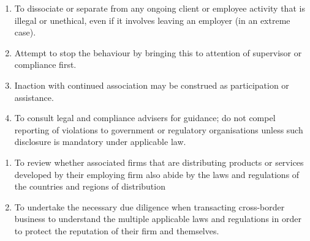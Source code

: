 \begin{remark} 
\begin{enumerate}[label=\roman*.]
\setlength{\itemsep}{0pt}
\item To dissociate or separate from any ongoing client or employee activity that is illegal or unethical, even if it involves leaving an employer (in an extreme case).
\item Attempt to stop the behaviour by bringing this to attention of supervisor or compliance first.
\item Inaction with continued association may be construed as participation or assistance.
\item To consult legal and compliance advisers for guidance; do not compel reporting of violations to government or regulatory organisations unless such disclosure is mandatory under applicable law.
\end{enumerate}
\end{remark}

\begin{remark} 
\begin{enumerate}[label=\roman*.]
\setlength{\itemsep}{0pt}
\item To review whether associated firms that are distributing products or services developed by their employing firm also abide by the laws and regulations of the countries and regions of distribution
\item To undertake the necessary due diligence when transacting cross-border business to understand the multiple applicable laws and regulations in order to protect the reputation of their firm and themselves.
\end{enumerate}
\end{remark}

